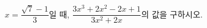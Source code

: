\hspace*{2mm}\begin{minipage}[t]{\dimexpr\linewidth-2mm\relax}\vspace{0pt}
$x=\dfrac{\sqrt{7}-1}{3}$일 때, $\dfrac{3x^3+2x^2-2x+1}{3x^2+2x}$의 값을 구하시오.\end{minipage}
